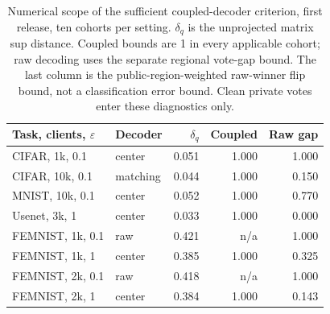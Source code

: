\begin{table}[t]
\caption{Numerical scope of the sufficient coupled-decoder criterion, first release, ten cohorts per setting. $\delta_q$ is the unprojected matrix sup distance. Coupled bounds are 1 in every applicable cohort; raw decoding uses the separate regional vote-gap bound. The last column is the public-region-weighted raw-winner flip bound, not a classification error bound. Clean private votes enter these diagnostics only.}
\label{tab:bound-values}\small
\centering
\begin{tabular}{@{}llrrr@{}}\toprule
Task, clients, $\varepsilon$ & Decoder & $\delta_q$ & Coupled & Raw gap \\
\midrule
CIFAR, 1k, 0.1 & center & 0.051 & 1.000 & 1.000 \\
CIFAR, 10k, 0.1 & matching & 0.044 & 1.000 & 0.150 \\
MNIST, 10k, 0.1 & center & 0.052 & 1.000 & 0.770 \\
Usenet, 3k, 1 & center & 0.033 & 1.000 & 0.000 \\
FEMNIST, 1k, 0.1 & raw & 0.421 & n/a & 1.000 \\
FEMNIST, 1k, 1 & center & 0.385 & 1.000 & 0.325 \\
FEMNIST, 2k, 0.1 & raw & 0.418 & n/a & 1.000 \\
FEMNIST, 2k, 1 & center & 0.384 & 1.000 & 0.143 \\
\bottomrule\end{tabular}
\end{table}
